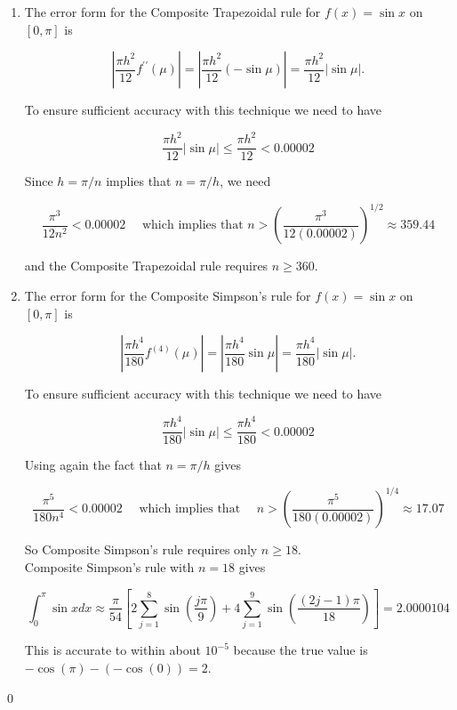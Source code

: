\begin{mysolution}
\begin{enumerate}[label=(\alph*)]
\item The error form for the Composite Trapezoidal rule for $f(x)=\sin x$ on $[0, \pi]$ is

$$
\left|\frac{\pi h^{2}}{12} f^{\prime \prime}(\mu)\right|=\left|\frac{\pi h^{2}}{12}(-\sin \mu)\right|=\frac{\pi h^{2}}{12}|\sin \mu| .
$$

To ensure sufficient accuracy with this technique we need to have

$$
\frac{\pi h^{2}}{12}|\sin \mu| \leq \frac{\pi h^{2}}{12}<0.00002
$$

Since $h=\pi / n$ implies that $n=\pi / h$, we need

$$
\frac{\pi^{3}}{12 n^{2}}<0.00002 \quad \text { which implies that } n>\left(\frac{\pi^{3}}{12(0.00002)}\right)^{1 / 2} \approx 359.44
$$

and the Composite Trapezoidal rule requires $n \geq 360$.
\item The error form for the Composite Simpson's rule for $f(x)=\sin x$ on $[0, \pi]$ is

$$
\left|\frac{\pi h^{4}}{180} f^{(4)}(\mu)\right|=\left|\frac{\pi h^{4}}{180} \sin \mu\right|=\frac{\pi h^{4}}{180}|\sin \mu| .
$$

To ensure sufficient accuracy with this technique we need to have

$$
\frac{\pi h^{4}}{180}|\sin \mu| \leq \frac{\pi h^{4}}{180}<0.00002
$$

Using again the fact that $n=\pi / h$ gives

$$
\frac{\pi^{5}}{180 n^{4}}<0.00002 \quad \text { which implies that } \quad n>\left(\frac{\pi^{5}}{180(0.00002)}\right)^{1 / 4} \approx 17.07
$$

So Composite Simpson's rule requires only $n \geq 18$.\\
Composite Simpson's rule with $n=18$ gives

$$
\int_{0}^{\pi} \sin x d x \approx \frac{\pi}{54}\left[2 \sum_{j=1}^{8} \sin \left(\frac{j \pi}{9}\right)+4 \sum_{j=1}^{9} \sin \left(\frac{(2 j-1) \pi}{18}\right)\right]=2.0000104
$$

This is accurate to within about $10^{-5}$ because the true value is $-\cos (\pi)-(-\cos (0))=2$.
\end{enumerate}\qed
\end{mysolution}

